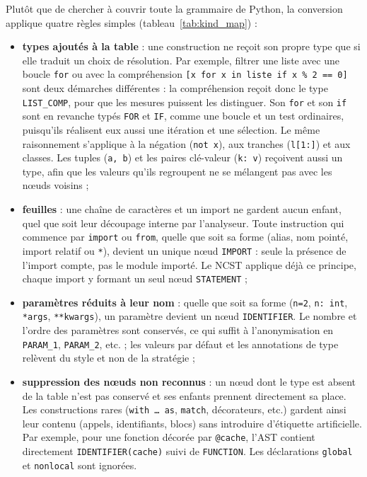 \documentclass[12pt,a4paper,oneside]{report}
\begin{document}
Plutôt que de chercher à couvrir toute la grammaire de Python, la conversion
applique quatre règles simples (tableau~\ref{tab:kind_map}) :
\begin{itemize}
  \item \textbf{types ajoutés à la table} : une construction ne reçoit son
        propre type que si elle traduit un choix de résolution. Par exemple,
        filtrer une liste avec une boucle \texttt{for} ou avec la
        compréhension \texttt{[x for x in liste if x \% 2 == 0]} sont deux
        démarches différentes : la compréhension reçoit donc le type
        \texttt{LIST\_COMP}, pour que les mesures puissent les distinguer.
        Son \texttt{for} et son \texttt{if} sont en revanche typés
        \texttt{FOR} et \texttt{IF}, comme une boucle et un test ordinaires,
        puisqu'ils réalisent eux aussi une itération et une sélection. Le
        même raisonnement s'applique à la négation (\texttt{not x}), aux
        tranches (\texttt{l[1:]}) et aux classes. Les tuples
        (\texttt{a, b}) et les paires clé-valeur (\texttt{k: v}) reçoivent
        aussi un type, afin que les valeurs qu'ils regroupent ne se mélangent
        pas avec les nœuds voisins ;
  \item \textbf{feuilles} : une chaîne de caractères et un import ne gardent
        aucun enfant, quel que soit leur découpage interne par l'analyseur.
        Toute instruction qui commence par \texttt{import} ou
        \texttt{from}, quelle que soit sa forme (alias, nom pointé, import
        relatif ou \texttt{*}), devient un unique nœud \texttt{IMPORT} : seule
        la présence de l'import compte, pas le module importé. Le NCST
        applique déjà ce principe, chaque import y formant un seul nœud
        \texttt{STATEMENT} ;
  \item \textbf{paramètres réduits à leur nom} : quelle que soit sa forme
        (\texttt{n=2}, \texttt{n: int}, \texttt{*args}, \texttt{**kwargs}),
        un paramètre devient un nœud \texttt{IDENTIFIER}. Le nombre et
        l'ordre des paramètres sont conservés, ce qui suffit à
        l'anonymisation en \texttt{PARAM\_1}, \texttt{PARAM\_2}, etc. ; les
        valeurs par défaut et les annotations de type relèvent du style et
        non de la stratégie ;
  \item \textbf{suppression des nœuds non reconnus} : un nœud dont le type
        est absent de la table n'est pas conservé et ses enfants prennent
        directement sa place. Les constructions rares (\texttt{with \dots\ as},
        \texttt{match}, décorateurs, etc.) gardent ainsi leur contenu
        (appels, identifiants, blocs) sans introduire d'étiquette
        artificielle. Par exemple, pour une fonction décorée par
        \texttt{@cache}, l'AST contient directement
        \texttt{IDENTIFIER(cache)} suivi de \texttt{FUNCTION}. Les
        déclarations \texttt{global} et \texttt{nonlocal} sont ignorées.
\end{itemize}
\end{document}
